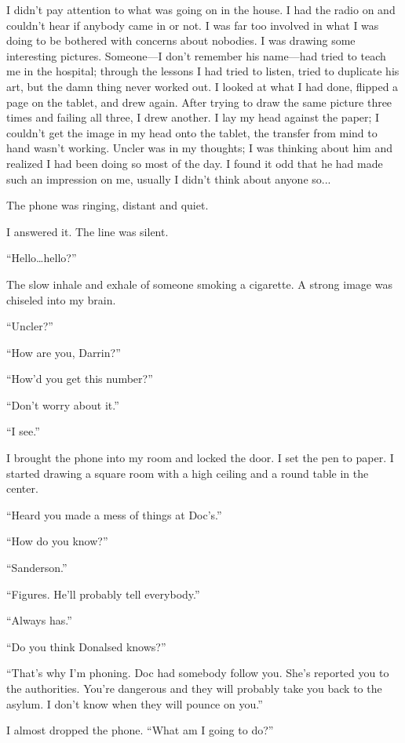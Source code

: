 \documentclass[
]{article}
\begin{document}
I didn't pay attention to what was going on in the house. I had the
radio on and couldn't hear if anybody came in or not. I was far too
involved in what I was doing to be bothered with concerns about
nobodies. I was drawing some interesting pictures. Someone---I don't
remember his name---had tried to teach me in the hospital; through the
lessons I had tried to listen, tried to duplicate his art, but the damn
thing never worked out. I looked at what I had done, flipped a page on
the tablet, and drew again. After trying to draw the same picture three
times and failing all three, I drew another. I lay my head against the
paper; I couldn't get the image in my head onto the tablet, the transfer
from mind to hand wasn't working. Uncler was in my thoughts; I was
thinking about him and realized I had been doing so most of the day. I
found it odd that he had made such an impression on me, usually I didn't
think about anyone so...

The phone was ringing, distant and quiet.

I answered it. The line was silent.

``Hello\ldots hello?''

The slow inhale and exhale of someone smoking a cigarette. A strong
image was chiseled into my brain.

``Uncler?''

``How are you, Darrin?''

``How'd you get this number?''

``Don't worry about it.''

``I see.''

I brought the phone into my room and locked the door. I set the pen to
paper. I started drawing a square room with a high ceiling and a round
table in the center.

``Heard you made a mess of things at Doc's.''

``How do you know?''

``Sanderson.''

``Figures. He'll probably tell everybody.''

``Always has.''

``Do you think Donalsed knows?''

``That's why I'm phoning. Doc had somebody follow you. She's reported
you to the authorities. You're dangerous and they will probably take you
back to the asylum. I don't know when they will pounce on you.''

I almost dropped the phone. ``What am I going to do?''
\end{document}
